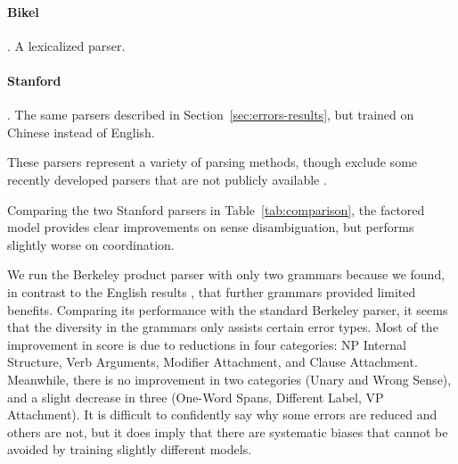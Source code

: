 \paragraph{Bikel} \parencite{Bikel-Chiang:2000:CLP}.
A lexicalized parser.

\paragraph{Stanford} \parencite{Levy-Manning:2003:ACL,Klein-Manning:2003:ACL,Klein-Manning:2003:NIPS}.
The same parsers described in Section~\ref{sec:errors-results}, but trained on Chinese instead of English.

These parsers represent a variety of parsing methods, though exclude some recently developed parsers that are not publicly available \parencite{Qian-Liu:2012:EMNLP,Xiong-etal:2005:IJCNLP}.

Comparing the two Stanford parsers in Table~\ref{tab:comparison}, the factored
model provides clear improvements on sense disambiguation, but performs
slightly worse on coordination.

We run the Berkeley product parser with only two grammars because we found, in contrast to the English results \parencite{Petrov:2010:NAACLHLT}, that further grammars provided limited benefits.
Comparing its performance with the
standard Berkeley parser, it seems that the diversity in the grammars only
assists certain error types.
Most of the improvement in score is due to reductions in four categories: NP Internal Structure, Verb Arguments, Modifier Attachment, and Clause Attachment.
Meanwhile, there is no improvement in two categories (Unary and Wrong Sense), and a slight decrease in three (One-Word Spans, Different Label, VP Attachment).
It is difficult to confidently say why some errors are reduced and others are not, but it does imply that there are systematic biases that cannot be avoided by training slightly different models.

